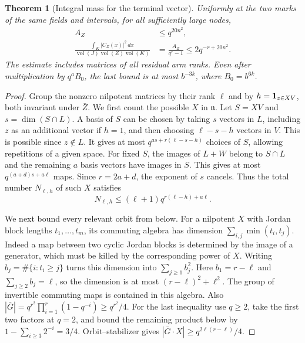 \documentclass[a4paper,11pt]{article}
\newtheorem{theorem}[proposition]{Theorem}
\theoremstyle{definition}
\theoremstyle{remark}
\numberwithin{equation}{section}
\begin{document}
\begin{theorem}[Integral mass for the terminal vector]
\leavevmode\label{thm:integralmass881}
Uniformly at the two marks of the same fields and intervals, for
all sufficiently large nodes,
\begin{align}
 A_Z &\le q^{20n^2},\label{eq:integralmass881}\\
 \frac{\int_K |C_Z(x)|^2\,dx}
      {\operatorname{vol}(J)\operatorname{vol}(Z)\operatorname{vol}(K)}
   &=\frac{A_Z}{q^r-1}\le 2q^{-r+20n^2}.\label{eq:fixernormalized881}
\end{align}
The estimate includes matrices of all residual arm ranks. Even
after multiplication by \(q^a B_0\), the last bound is at most
\(b^{-3k}\), where \(B_0=b^{6k}\).
\end{theorem}
\begin{proof}
Group the nonzero nilpotent matrices by their rank \(\ell\) and
by \(h={\bf1}_{z\in XV}\), both invariant under \(\bar Z\). We
first count the possible \(X\) in \(\mathfrak n\). Let \(S=XV\)
and \(s=\dim(S\cap L)\). A basis of \(S\) can be chosen by taking
\(s\) vectors in \(L\), including \(z\) as an additional vector
if \(h=1\), and then choosing \(\ell-s-h\) vectors in \(V\).
This is possible since \(z\notin L\). It gives at most
\(q^{as+r(\ell-s-h)}\) choices of \(S\), allowing repetitions
of a given space. For fixed \(S\), the images of \(L+W\)
belong to \(S\cap L\) and the remaining \(a\) basis vectors have
images in \(S\). This gives at most \(q^{(a+d)s+a\ell}\) maps.
Since \(r=2a+d\), the exponent of \(s\) cancels. Thus the total
number \(N_{\ell,h}\) of such \(X\) satisfies
\[
                   N_{\ell,h}\le(\ell+1)q^{r(\ell-h)+a\ell}.
\]

We next bound every relevant orbit from below. For a nilpotent
\(X\) with Jordan block lengths \(t_1,\ldots,t_m\), its
commuting algebra has dimension \(\sum_{i,j}\min(t_i,t_j)\).
Indeed a map between two cyclic Jordan blocks is determined by
the image of a generator, which must be killed by the
corresponding power of \(X\). Writing \(b_j=\#\{i:t_i\ge j\}\)
turns this dimension into \(\sum_{j\ge1}b_j^2\). Here
\(b_1=r-\ell\) and \(\sum_{j\ge2}b_j=\ell\), so the dimension
is at most \((r-\ell)^2+\ell^2\). The group of invertible
commuting maps is contained in this algebra. Also
\(|\bar G|=q^{r^2}\prod_{i=1}^r(1-q^{-i})\ge q^{r^2}/4\).
For the last inequality use \(q\ge2\), take the first two factors
at \(q=2\), and bound the remaining product below by
\(1-\sum_{i\ge3}2^{-i}=3/4\). Orbit--stabilizer gives
\(|\bar G\cdot X|\ge q^{2\ell(r-\ell)}/4\).


\end{proof}
\end{document}
